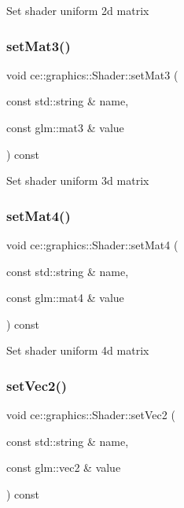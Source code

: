 Set shader uniform 2d matrix \mbox{\label{classce_1_1graphics_1_1_shader_a52a066ab5a24e7f4596931e9c0e325e6}} 
\subsubsection{\texorpdfstring{set\+Mat3()}{setMat3()}}
{\footnotesize\ttfamily void ce\+::graphics\+::\+Shader\+::set\+Mat3 (\begin{DoxyParamCaption}\item[{const std\+::string \&}]{name,  }\item[{const glm\+::mat3 \&}]{value }\end{DoxyParamCaption}) const}

Set shader uniform 3d matrix \mbox{\label{classce_1_1graphics_1_1_shader_ae5f67d260222f5b315ea097b3d898c9f}} 
\subsubsection{\texorpdfstring{set\+Mat4()}{setMat4()}}
{\footnotesize\ttfamily void ce\+::graphics\+::\+Shader\+::set\+Mat4 (\begin{DoxyParamCaption}\item[{const std\+::string \&}]{name,  }\item[{const glm\+::mat4 \&}]{value }\end{DoxyParamCaption}) const}

Set shader uniform 4d matrix \mbox{\label{classce_1_1graphics_1_1_shader_a14c07171e23106041bb1dbb683a19d2f}} 
\subsubsection{\texorpdfstring{set\+Vec2()}{setVec2()}\hspace{0.1cm}{\footnotesize\ttfamily [1/2]}}
{\footnotesize\ttfamily void ce\+::graphics\+::\+Shader\+::set\+Vec2 (\begin{DoxyParamCaption}\item[{const std\+::string \&}]{name,  }\item[{const glm\+::vec2 \&}]{value }\end{DoxyParamCaption}) const}


